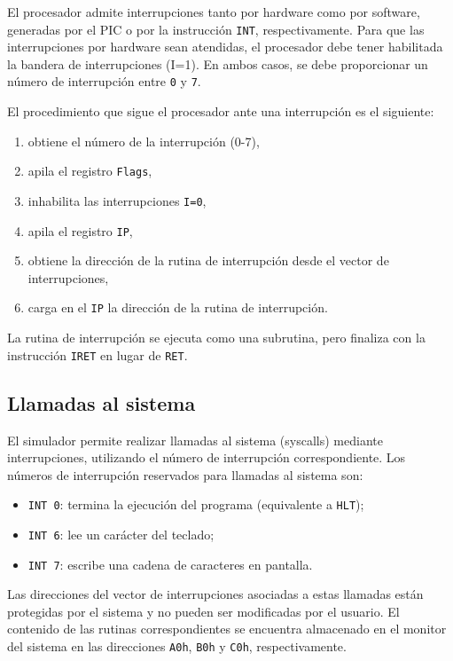 \documentclass[12pt,oneside]{templates/unerthesis}
\providecommand{\tightlist}{%
  \setlength{\itemsep}{0pt}\setlength{\parskip}{0pt}}
\begin{document}
El procesador admite interrupciones tanto por hardware como por software, generadas por el PIC o por la instrucción \texttt{INT}, respectivamente. Para que las interrupciones por hardware sean atendidas, el procesador debe tener habilitada la bandera de interrupciones (I=1). En ambos casos, se debe proporcionar un número de interrupción entre \texttt{0} y \texttt{7}.

El procedimiento que sigue el procesador ante una interrupción es el siguiente:

\begin{enumerate}
\def\labelenumi{\arabic{enumi}.}
\tightlist
\item
  obtiene el número de la interrupción (0-7),
\item
  apila el registro \texttt{Flags},
\item
  inhabilita las interrupciones \texttt{I=0},
\item
  apila el registro \texttt{IP},
\item
  obtiene la dirección de la rutina de interrupción desde el vector de interrupciones,
\item
  carga en el \texttt{IP} la dirección de la rutina de interrupción.
\end{enumerate}

La rutina de interrupción se ejecuta como una subrutina, pero finaliza con la instrucción \texttt{IRET} en lugar de \texttt{RET}.

\hypertarget{llamadas-al-sistema}{%
\subsection{Llamadas al sistema}\label{llamadas-al-sistema}}

El simulador permite realizar llamadas al sistema (syscalls) mediante interrupciones, utilizando el número de interrupción correspondiente. Los números de interrupción reservados para llamadas al sistema son:

\begin{itemize}
\tightlist
\item
  \texttt{INT\ 0}: termina la ejecución del programa (equivalente a \texttt{HLT});
\item
  \texttt{INT\ 6}: lee un carácter del teclado;
\item
  \texttt{INT\ 7}: escribe una cadena de caracteres en pantalla.
\end{itemize}

Las direcciones del vector de interrupciones asociadas a estas llamadas están protegidas por el sistema y no pueden ser modificadas por el usuario. El contenido de las rutinas correspondientes se encuentra almacenado en el monitor del sistema en las direcciones \texttt{A0h}, \texttt{B0h} y \texttt{C0h}, respectivamente.
\end{document}
